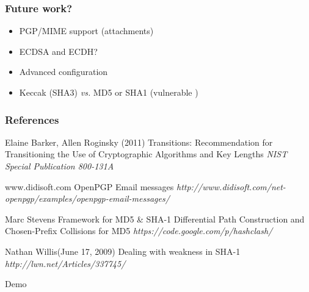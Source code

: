\documentclass{beamer}
\begin{document}

\begin{frame}[fragile] %
\frametitle{Future work?}
\begin{itemize}
\item PGP/MIME support (attachments)
\item ECDSA and ECDH?
\item Advanced configuration 
\item Keccak (SHA3) \emph{vs.} MD5 or SHA1 (vulnerable \cite{sh})
\end{itemize}
\end{frame}


\begin{frame}
\frametitle{References}
\footnotesize{
\begin{thebibliography}{99} 

 Elaine Barker, Allen Roginsky (2011)
\newblock Transitions: Recommendation for Transitioning the Use of Cryptographic Algorithms and Key Lengths
\newblock \emph{NIST Special Publication 800-131A}

 www.didisoft.com
\newblock OpenPGP Email messages
\newblock \emph{http://www.didisoft.com/net-openpgp/examples/openpgp-email-messages/}

 Marc Stevens
\newblock Framework for MD5 \& SHA-1 Differential Path Construction and Chosen-Prefix Collisions for MD5
\newblock \emph{https://code.google.com/p/hashclash/}

 Nathan Willis(June 17, 2009)
\newblock Dealing with weakness in SHA-1
\newblock \emph{http://lwn.net/Articles/337745/}

\end{thebibliography}
}
\end{frame}


\begin{frame}
\Huge{\centerline{Demo}}
\end{frame}

\end{document}
